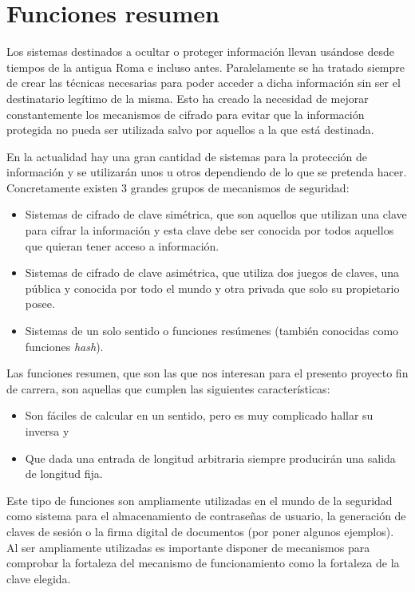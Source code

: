 \chapter{Funciones resumen}\label{cap2}

Los sistemas destinados a ocultar o proteger información llevan usándose desde tiempos de la antigua Roma \cite{Luciano87cryptology:from} e incluso antes. Paralelamente se ha tratado siempre de crear las técnicas necesarias para poder acceder a dicha información sin ser el destinatario legítimo de la misma. Esto ha creado la necesidad de mejorar constantemente los mecanismos de cifrado para evitar que la información protegida no pueda ser utilizada salvo por aquellos a la que está destinada.

En la actualidad hay una gran cantidad de sistemas para la protección de información y se utilizarán unos u otros dependiendo de lo que se pretenda hacer. Concretamente existen 3 grandes grupos de mecanismos de seguridad:
\begin{itemize}
	\item Sistemas de cifrado de clave simétrica, que son aquellos que utilizan una clave para cifrar la información y esta clave debe ser conocida por todos aquellos que quieran tener acceso a información.
	\item Sistemas de cifrado de clave asimétrica, que utiliza dos juegos de claves, una pública y conocida por todo el mundo y otra privada que solo su propietario posee.
	\item Sistemas de un solo sentido o funciones resúmenes (también conocidas como funciones \emph{hash}).
\end{itemize}

Las funciones resumen, que son las que nos interesan para el presento proyecto fin de carrera, son aquellas que cumplen las siguientes características:

\begin{itemize}
	\item Son fáciles de calcular en un sentido, pero es muy complicado hallar su inversa y
	\item Que dada una entrada de longitud arbitraria siempre producirán una salida de longitud fija.
\end{itemize}

Este tipo de funciones son ampliamente utilizadas en el mundo de la seguridad como sistema para el almacenamiento de contraseñas de usuario, la generación de claves de sesión o la firma digital de documentos (por poner algunos ejemplos). Al ser ampliamente utilizadas es importante disponer de mecanismos para comprobar la fortaleza del mecanismo de funcionamiento como la fortaleza de la clave elegida.

